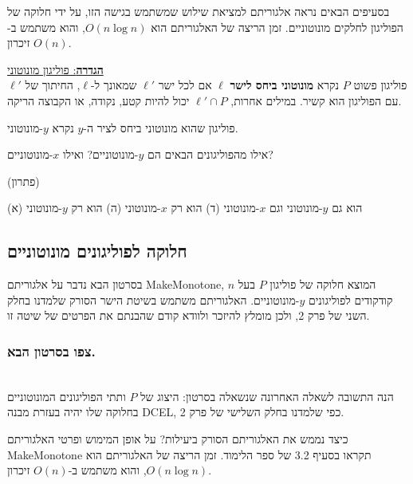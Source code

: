 \documentclass[
]{book}
\begin{document}
בסעיפים הבאים נראה אלגוריתם למציאת שילוש שמשתמש בגישה הזו, על ידי חלוקה של הפוליגון לחלקים מונוטוניים. זמן הריצה של האלגוריתם הוא \(O(n \log n)\), והוא משתמש ב-\(O(n)\) זיכרון.

\ul{\textbf{הגדרה}: פוליגון מונוטוני}\\
פוליגון פשוט \(P\) נקרא \textbf{מונוטוני ביחס לישר} \(\ell\) אם לכל ישר \(\ell'\) שמאונך ל-\(\ell\), החיתוך של \(\ell'\)עם הפוליגון הוא קשיר. במילים אחרות, \(\ell'\cap P\) יכול להיות קטע, נקודה, או הקבוצה הריקה.

פוליגון שהוא מונוטוני ביחס לציר ה-\(y\) נקרא \(y\)-מונוטוני.

אילו מהפוליגונים הבאים הם \(y\)-מונוטוניים? ואילו \(x\)-מונוטוניים?

(פתרון)

(א) הוא גם \(y\)-מונוטוני וגם \(x\)-מונוטוני (ד) הוא רק \(x\)-מונוטוני (ה) הוא רק \(y\)-מונוטוני

\hypertarget{ux5d7ux5dcux5d5ux5e7ux5d4-ux5dcux5e4ux5d5ux5dcux5d9ux5d2ux5d5ux5e0ux5d9ux5dd-ux5deux5d5ux5e0ux5d5ux5d8ux5d5ux5e0ux5d9ux5d9ux5dd}{%
\subsection{חלוקה לפוליגונים מונוטוניים}\label{ux5d7ux5dcux5d5ux5e7ux5d4-ux5dcux5e4ux5d5ux5dcux5d9ux5d2ux5d5ux5e0ux5d9ux5dd-ux5deux5d5ux5e0ux5d5ux5d8ux5d5ux5e0ux5d9ux5d9ux5dd}}

בסרטון הבא נדבר על אלגוריתם MakeMonotone, המוצא חלוקה של פוליגון \(P\) בעל \(n\) קודקודים לפוליגונים \(y\)-מונוטוניים. האלגוריתם משתמש בשיטת הישר הסורק שלמדנו בחלק השני של פרק 2, ולכן מומלץ להיזכר ולוודא קודם שהבנתם את הפרטים של שיטה זו.

\hypertarget{ux5e6ux5e4ux5d5-ux5d1ux5e1ux5e8ux5d8ux5d5ux5df-ux5d4ux5d1ux5d0.-3}{%
\subsubsection*{צפו בסרטון הבא.}\label{ux5e6ux5e4ux5d5-ux5d1ux5e1ux5e8ux5d8ux5d5ux5df-ux5d4ux5d1ux5d0.-3}}

~\\
הנה התשובה לשאלה האחרונה שנשאלה בסרטון: היצוג של \(P\) ותתי הפוליגונים המונוטוניים בחלוקה שלו יהיה בעזרת מבנה DCEL, כפי שלמדנו בחלק השלישי של פרק 2.

כיצד נממש את האלגוריתם הסורק ביעילות? על אופן המימוש ופרטי האלגוריתם MakeMonotone תקראו בסעיף 3.2 של ספר הלימוד. זמן הריצה של האלגוריתם הוא \(O(n \log n)\), והוא משתמש ב-\(O(n)\) זיכרון.
\end{document}
